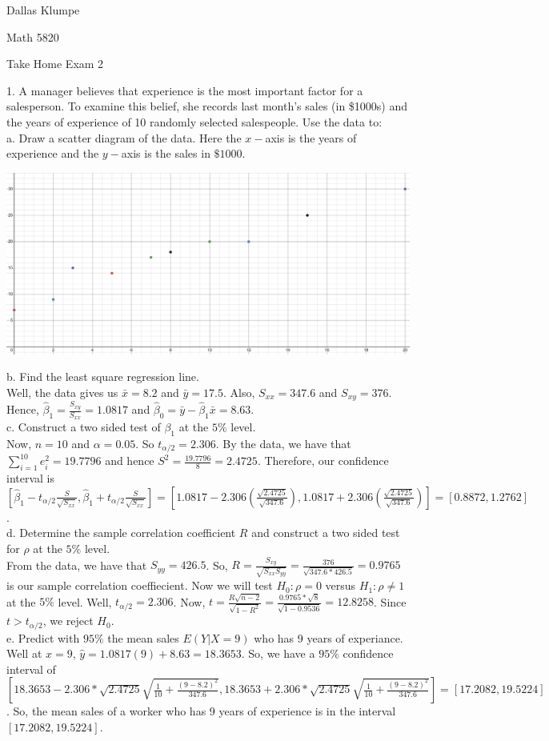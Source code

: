 \documentclass[12pt]{article}
\begin{document}
\noindent Dallas Klumpe

\noindent Math 5820

\noindent Take Home Exam 2

1. A manager believes that experience is the most important factor for a salesperson. To examine this belief, she records last month’s sales (in \$1000s) and the years of experience of 10 randomly selected salespeople. Use the data to:\\
a. Draw a scatter diagram of the data. Here the $x-$axis is the years of experience and the $y-$axis is the sales in $\$1000$.
\begin{center}
\includegraphics[scale=0.5]{scatplot.JPG}
\end{center}
b. Find the least square regression line.\\
Well, the data gives us $\bar{x}=8.2$ and $\bar{y}=17.5$. Also, $S_{xx}=347.6$ and $S_{xy}=376$. Hence, $\hat{\beta}_1=\frac{S_{xy}}{S_{xx}}=1.0817$ and $\hat{\beta}_0=\bar{y}-\hat{\beta}_1\bar{x}=8.63$.\\
c. Construct a two sided test of $\beta_1$ at the $5\%$ level.\\
Now, $n=10$ and $\alpha=0.05$. So $t_{\alpha/2}=2.306$. By the data, we have that $\sum_{i=1}^10e_i^2=19.7796$ and hence $S^2=\frac{19.7796}{8}=2.4725$. Therefore, our confidence interval is $[\hat{\beta}_1-t_{\alpha/2}\frac{S}{\sqrt{S_{xx}}}, \hat{\beta}_1+t_{\alpha/2}\frac{S}{\sqrt{S_{xx}}}]=[1.0817-2.306(\frac{\sqrt{2.4725}}{\sqrt{347.6}}), 1.0817+2.306(\frac{\sqrt{2.4725}}{\sqrt{347.6}})]=[0.8872, 1.2762]$.\\
d. Determine the sample correlation coefficient $R$ and construct a two sided test for $\rho$ at the $5\%$ level.\\
From the data, we have that $S_{yy}=426.5$. So, $R=\frac{S_{xy}}{\sqrt{S_{xx}S_{yy}}}=\frac{376}{\sqrt{347.6*426.5}}=0.9765$ is our sample correlation coeffiecient. Now we will test $H_0:\rho=0$ versus $H_1:\rho\neq1$ at the $5\%$ level. Well, $t_{\alpha/2}=2.306$. Now, $t=\frac{R\sqrt{n-2}}{\sqrt{1-R^2}}=\frac{0.9765*\sqrt{8}}{\sqrt{1-0.9536}}=12.8258$. Since $t>t_{\alpha/2}$, we reject $H_0$.\\
e. Predict with $95\%$ the mean sales $E(Y|X=9)$ who has 9 years of experiance.\\
Well at $x=9$, $\hat{y}=1.0817(9)+8.63=18.3653$. So, we have a $95\%$ confidence interval of $[18.3653-2.306*\sqrt{2.4725}\sqrt{\frac{1}{10}+\frac{(9-8.2)^2}{347.6}}, 18.3653+2.306*\sqrt{2.4725}\sqrt{\frac{1}{10}+\frac{(9-8.2)^2}{347.6}}]=[17.2082, 19.5224]$. So, the mean sales of a worker who has 9 years of experience is in the interval $[17.2082, 19.5224]$.\\[20pt]
\end{document}
